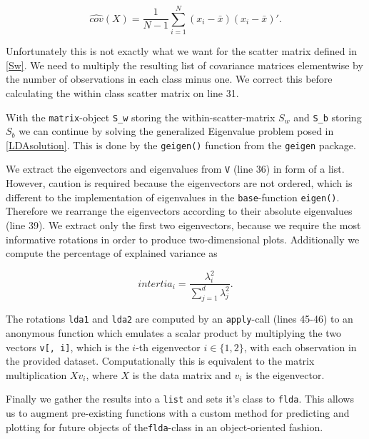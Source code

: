 \documentclass{article}
\begin{document}
$$\hat{cov}(X) = \frac{1}{N-1} \sum_{i = 1}^{N}(x_i - \bar{x})(x_i - \bar{x})\prime.$$

Unfortunately this is not exactly what we want for the scatter matrix defined in \ref{Sw}. We need to multiply the resulting list of covariance matrices elementwise by the number of observations in each class minus one. We correct this before calculating the within class scatter matrix on line 31. 



With the \texttt{matrix}-object \texttt{S\_w} storing the within-scatter-matrix $S_w$ and \texttt{S\_b} storing $S_b$ we can continue by solving the generalized Eigenvalue problem posed in \ref{LDAsolution}. This is done by the \texttt{geigen()} function from the \texttt{geigen} package.



We extract the eigenvectors and eigenvalues from \texttt{V} (line 36) in form of a list. However, caution is required because the eigenvectors are not ordered, which is different to the implementation of eigenvalues in the \texttt{base}-function \texttt{eigen()}. Therefore we rearrange the eigenvectors according to their absolute eigenvalues (line 39). We extract only the first two eigenvectors, because we require the most informative rotations in order to produce two-dimensional plots. Additionally we compute the percentage of explained variance as 

\begin{equation}
intertia_i = \frac{\lambda_i^2}{\sum_{j=1}^{d}\lambda_{j}^{2}}.
\end{equation}

The rotations \texttt{lda1} and \texttt{lda2} are computed by an \texttt{apply}-call (lines 45-46) to an anonymous function which emulates a scalar product by multiplying the two vectors \texttt{v[, i]}, which is the $i$-th eigenvector $i \in \{1, 2\}$, with each observation in the provided dataset. Computationally this is equivalent to the matrix multiplication $Xv_i$, where $X$ is the data matrix and $v_i$ is the eigenvector.

Finally we gather the results into a \texttt{list} and sets it's class to \texttt{flda}. This allows us to augment pre-existing functions with a custom method for predicting and plotting for future objects of the\texttt{flda}-class in an object-oriented fashion.
\end{document}
